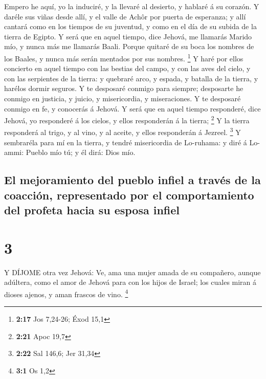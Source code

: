  Empero he aquí, yo la induciré, y la llevaré al desierto,
y hablaré á su corazón.  Y daréle sus viñas desde allí, y
el valle de Achôr por puerta de esperanza; y allí cantará como en los
tiempos de su juventud, y como en el día de su subida de la tierra de
Egipto.  Y será que en aquel tiempo, dice Jehová, me
llamarás Marido mío, y nunca más me llamarás Baali.  Porque
quitaré de su boca los nombres de los Baales, y nunca más serán mentados
por sus nombres. \footnote{\textbf{2:17} Jos 7,24-26; Éxod 15,1}
 Y haré por ellos concierto en aquel tiempo con las bestias
del campo, y con las aves del cielo, y con las serpientes de la tierra:
y quebraré arco, y espada, y batalla de la tierra, y harélos dormir
seguros.  Y te desposaré conmigo para siempre; desposarte
he conmigo en justicia, y juicio, y misericordia, y miseraciones.
 Y te desposaré conmigo en fe, y conocerás á Jehová.
 Y será que en aquel tiempo responderé, dice Jehová, yo
responderé á los cielos, y ellos responderán á la tierra; \footnote{\textbf{2:21}
  Apoc 19,7}  Y la tierra responderá al trigo, y al vino, y
al aceite, y ellos responderán á Jezreel. \footnote{\textbf{2:22} Sal
  146,6; Jer 31,34}  Y sembraréla para mí en la tierra, y
tendré misericordia de Lo-ruhama: y diré á Lo-ammi: Pueblo mío tú; y él
dirá: Dios mío.

\hypertarget{el-mejoramiento-del-pueblo-infiel-a-travuxe9s-de-la-coacciuxf3n-representado-por-el-comportamiento-del-profeta-hacia-su-esposa-infiel}{%
\subsection{El mejoramiento del pueblo infiel a través de la coacción,
representado por el comportamiento del profeta hacia su esposa
infiel}\label{el-mejoramiento-del-pueblo-infiel-a-travuxe9s-de-la-coacciuxf3n-representado-por-el-comportamiento-del-profeta-hacia-su-esposa-infiel}}

\hypertarget{section-2}{%
\section{3}\label{section-2}}

 Y DÍJOME otra vez Jehová: Ve, ama una mujer amada de su
compañero, aunque adúltera, como el amor de Jehová para con los hijos de
Israel; los cuales miran á dioses ajenos, y aman frascos de vino.
\footnote{\textbf{3:1} Os 1,2}

